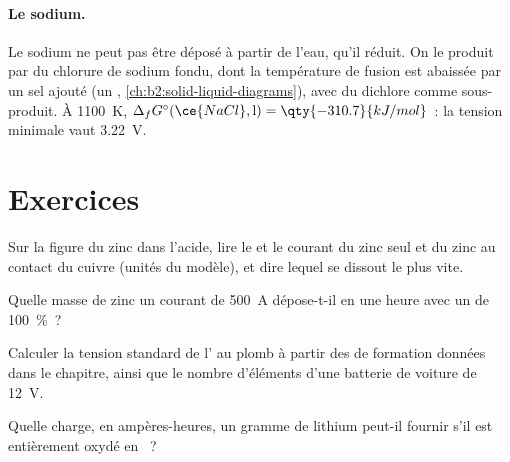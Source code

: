 \paragraph{Le sodium.} Le sodium ne peut pas être déposé à partir de l'eau, qu'il réduit.
On le produit par  du chlorure de sodium fondu, dont la température de fusion est
abaissée par un sel ajouté (un , \cref{ch:b2:solid-liquid-diagrams}),
avec du dichlore comme sous-produit. À \qty{1100}{K}, $\Delta_f G^\circ(\ce{NaCl}, \text{l}) =
\qty{-310.7}{kJ/mol}$~: la tension minimale vaut \qty{3.22}{V}.

\section{Exercices}

\begin{exercise}[$\star$]\label{exo:b2:batteries-electrolysis:1}
Sur la figure du zinc dans l'acide, lire le  et le courant du zinc
seul et du zinc au contact du cuivre (unités du modèle), et dire lequel se dissout
le plus vite.
\end{exercise}

\begin{exercise}[$\star$]\label{exo:b2:batteries-electrolysis:2}
Quelle masse de zinc un courant de \qty{500}{A} dépose-t-il en une heure avec un
 de 100~\%~?
\end{exercise}

\begin{exercise}[$\star$]\label{exo:b2:batteries-electrolysis:3}
Calculer la tension standard de l' au plomb à partir des 
de formation données dans le chapitre, ainsi que le nombre d'éléments d'une
batterie de voiture de \qty{12}{V}.
\end{exercise}

\begin{exercise}[$\star$]\label{exo:b2:batteries-electrolysis:4}
Quelle charge, en ampères-heures, un gramme de lithium peut-il fournir s'il est entièrement
oxydé en ~?
\end{exercise}

